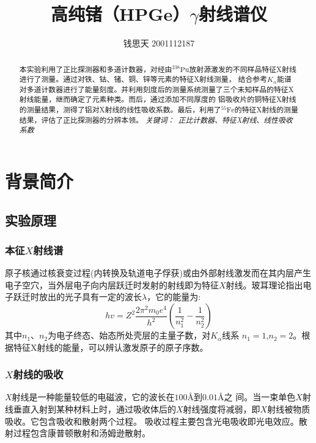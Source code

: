 \documentclass{article}
\title{高纯锗（HPGe）$\gamma$射线谱仪}
\author{钱思天 2001112187}
\begin{document}
    \maketitle
    \begin{abstract}
        本实验利用了正比探测器和多道计数器，对经由$^{238}\text{Pu}$放射源激发的不同样品特征X射线进行了测量。通过对铁、钴、锗、铜、锌等元素的特征X射线测量，
        结合参考$K_\alpha$能谱对多道计数器进行了能量刻度。并利用刻度后的测量系统测量了三个未知样品的特征X射线能量，继而确定了元素种类。而后，通过添加不同厚度的
        铝吸收片的铜特征X射线的测量结果，测得了铝对X射线的线性吸收系数。最后，利用了$^{55}\text{Fe}$的特征X射线的测量结果，评估了正比探测器的分辨本领。
        \newline
        \newline
        {\emph{ 关键词：\ 正比计数器、特征X射线、线性吸收系数 }\rm}

    \end{abstract}

    \section{背景简介}
    \subsection{实验原理}
    \subsubsection{本征$X$射线谱}
    原子核通过核衰变过程(内转换及轨道电子俘获)或由外部射线激发而在其内层产生电子空穴，当外层电子向内层跃迁时发射的射线即为特征$X$射线。玻耳理论指出电子跃迁时放出的光子具有一定的波长$\lambda$，它的能量为:
    \begin{equation}
        h v=Z^{2} \frac{2 \pi^{2} m_{0} e^{4}}{h^{2}}\left(\frac{1}{n_{1}^{2}}-\frac{1}{n_{2}^{2}}\right)
    \end{equation}
其中$n_1$、$n_2$为电子终态、始态所处壳层的主量子数，对$K_\alpha$线系
$n_1=1$,$n_2=2$。根据特征X射线的能量，可以辨认激发原子的原子序数。
    \subsubsection{$X$射线的吸收}
    $X$射线是一种能量较低的电磁波，它的波长在$100\text{\AA}$到$0.01\text{\AA}$之
间。当一束单色$X$射线垂直入射到某种材料上时，通过吸收体后的$X$射线强度将减弱，即$X$射线被物质吸收。它包含吸收和散射两个过程。
吸收过程主要包含光电吸收即光电效应。散射过程包含康普顿散射和汤姆逊散射。
\end{document}
